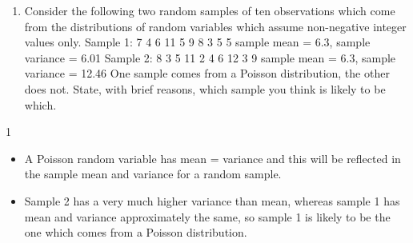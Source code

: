 \documentclass[a4paper,12pt]{article}
\begin{document}
\begin{enumerate}

\item Consider the following two random samples of ten observations which come from the
distributions of random variables which assume non-negative integer values only.
Sample 1: 7 4 6 11 5 9 8 3 5 5
sample mean = 6.3, sample variance = 6.01
Sample 2: 8 3 5 11 2 4 6 12 3 9
sample mean = 6.3, sample variance = 12.46
One sample comes from a Poisson distribution, the other does not.
State, with brief reasons, which sample you think is likely to be which.



\end{enumerate}
\newpage
1
\begin{itemize}
    \item A Poisson random variable has mean = variance and this will be reflected in the
sample mean and variance for a random sample.
\item Sample 2 has a very much higher variance than mean, whereas sample 1 has mean
and variance approximately the same, so sample 1 is likely to be the one which comes
from a Poisson distribution.
\end{itemize}
\end{document}

